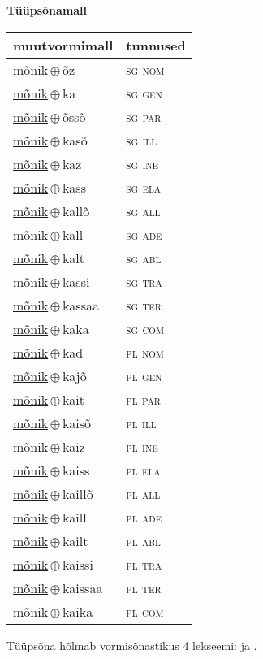 

\vspace{3.5em}
\noindent \begin{minipage}{\textwidth}
\noindent \textbf{Tüüpsõnamall \,}\\

\begin{sideways}
\begin{tabular}{l l}
muutvormimall & tunnused \\
\hline
\underline{mõnik}\,$\oplus$\,õz & \textsc{ sg nom } \\
\underline{mõnik}\,$\oplus$\,ka & \textsc{ sg gen } \\
\underline{mõnik}\,$\oplus$\,õssõ & \textsc{ sg par } \\
\underline{mõnik}\,$\oplus$\,kasõ & \textsc{ sg ill } \\
\underline{mõnik}\,$\oplus$\,kaz & \textsc{ sg ine } \\
\underline{mõnik}\,$\oplus$\,kass & \textsc{ sg ela } \\
\underline{mõnik}\,$\oplus$\,kallõ & \textsc{ sg all } \\
\underline{mõnik}\,$\oplus$\,kall & \textsc{ sg ade } \\
\underline{mõnik}\,$\oplus$\,kalt & \textsc{ sg abl } \\
\underline{mõnik}\,$\oplus$\,kassi & \textsc{ sg tra } \\
\underline{mõnik}\,$\oplus$\,kassaa & \textsc{ sg ter } \\
\underline{mõnik}\,$\oplus$\,kaka & \textsc{ sg com } \\
\underline{mõnik}\,$\oplus$\,kad & \textsc{ pl nom } \\
\underline{mõnik}\,$\oplus$\,kajõ & \textsc{ pl gen } \\
\underline{mõnik}\,$\oplus$\,kait & \textsc{ pl par } \\
\underline{mõnik}\,$\oplus$\,kaisõ & \textsc{ pl ill } \\
\underline{mõnik}\,$\oplus$\,kaiz & \textsc{ pl ine } \\
\underline{mõnik}\,$\oplus$\,kaiss & \textsc{ pl ela } \\
\underline{mõnik}\,$\oplus$\,kaillõ & \textsc{ pl all } \\
\underline{mõnik}\,$\oplus$\,kaill & \textsc{ pl ade } \\
\underline{mõnik}\,$\oplus$\,kailt & \textsc{ pl abl } \\
\underline{mõnik}\,$\oplus$\,kaissi & \textsc{ pl tra } \\
\underline{mõnik}\,$\oplus$\,kaissaa & \textsc{ pl ter } \\
\underline{mõnik}\,$\oplus$\,kaika & \textsc{ pl com } \\
\end{tabular}
\end{sideways}
\label{tab:tüüpsõnamall-mõnikõz}

\end{minipage}

 
\vspace{1em}
\noindent Tüüpsõna hõlmab vormisõnastikus 4 lekseemi:  ja .
